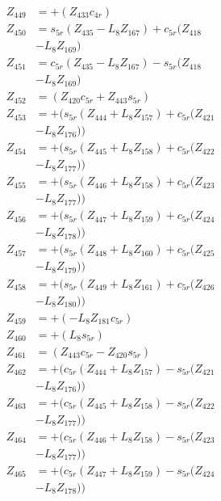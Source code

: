 \begin{multicols}{2}
\begin{align}
Z_{449} &= + (Z_{433}c_{4r}) \nonumber \\
Z_{450} &= s_{5r}(Z_{435} - L_8Z_{167}) + c_{5r}(Z_{418}  \nonumber \\
&- L_8Z_{169}) \nonumber \\
Z_{451} &= c_{5r}(Z_{435} - L_8Z_{167}) - s_{5r}(Z_{418}  \nonumber \\
&- L_8Z_{169}) \nonumber \\
Z_{452} &= (Z_{420}c_{5r} + Z_{443}s_{5r}) \nonumber \\
Z_{453} &= + (s_{5r}(Z_{444} + L_8Z_{157}) + c_{5r}(Z_{421}  \nonumber \\
&- L_8Z_{176})) \nonumber \\
Z_{454} &= + (s_{5r}(Z_{445} + L_8Z_{158}) + c_{5r}(Z_{422}  \nonumber \\
&- L_8Z_{177})) \nonumber \\
Z_{455} &= + (s_{5r}(Z_{446} + L_8Z_{158}) + c_{5r}(Z_{423}  \nonumber \\
&- L_8Z_{177})) \nonumber \\
Z_{456} &= + (s_{5r}(Z_{447} + L_8Z_{159}) + c_{5r}(Z_{424}  \nonumber \\
&- L_8Z_{178})) \nonumber \\
Z_{457} &= + (s_{5r}(Z_{448} + L_8Z_{160}) + c_{5r}(Z_{425}  \nonumber \\
&- L_8Z_{179})) \nonumber \\
Z_{458} &= + (s_{5r}(Z_{449} + L_8Z_{161}) + c_{5r}(Z_{426}  \nonumber \\
&- L_8Z_{180})) \nonumber \\
Z_{459} &= + (-L_8Z_{181}c_{5r}) \nonumber \\
Z_{460} &= + (L_8s_{5r}) \nonumber \\
Z_{461} &= (Z_{443}c_{5r} - Z_{420}s_{5r}) \nonumber \\
Z_{462} &= + (c_{5r}(Z_{444} + L_8Z_{157}) - s_{5r}(Z_{421}  \nonumber \\
&- L_8Z_{176})) \nonumber \\
Z_{463} &= + (c_{5r}(Z_{445} + L_8Z_{158}) - s_{5r}(Z_{422}  \nonumber \\
&- L_8Z_{177})) \nonumber \\
Z_{464} &= + (c_{5r}(Z_{446} + L_8Z_{158}) - s_{5r}(Z_{423}  \nonumber \\
&- L_8Z_{177})) \nonumber \\
Z_{465} &= + (c_{5r}(Z_{447} + L_8Z_{159}) - s_{5r}(Z_{424}  \nonumber \\
&- L_8Z_{178})) \nonumber \\

\end{align}
\end{multicols}

